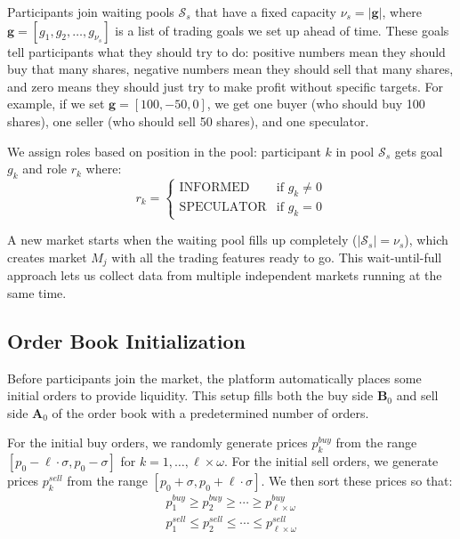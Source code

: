 Participants join waiting pools $\mathcal{S}_s$ that have a fixed capacity $\nu_s = |\mathbf{g}|$, where $\mathbf{g} = [g_1, g_2, \ldots, g_{\nu_s}]$ is a list of trading goals we set up ahead of time. These goals tell participants what they should try to do: positive numbers mean they should buy that many shares, negative numbers mean they should sell that many shares, and zero means they should just try to make profit without specific targets. For example, if we set $\mathbf{g} = [100, -50, 0]$, we get one buyer (who should buy 100 shares), one seller (who should sell 50 shares), and one speculator.

We assign roles based on position in the pool: participant $k$ in pool $\mathcal{S}_s$ gets goal $g_k$ and role $r_k$ where:
\begin{equation}
r_k = \begin{cases}
\text{INFORMED} & \text{if } g_k \neq 0 \\
\text{SPECULATOR} & \text{if } g_k = 0
\end{cases}
\end{equation}

A new market starts when the waiting pool fills up completely ($|\mathcal{S}_s| = \nu_s$), which creates market $M_j$ with all the trading features ready to go. This wait-until-full approach lets us collect data from multiple independent markets running at the same time.

\subsection{Order Book Initialization}

Before participants join the market, the platform automatically places some initial orders to provide liquidity. This setup fills both the buy side $\mathbf{B}_0$ and sell side $\mathbf{A}_0$ of the order book with a predetermined number of orders.

For the initial buy orders, we randomly generate prices $p^{buy}_k$ from the range $[p_0 - \ell \cdot \sigma, p_0 - \sigma]$ for $k = 1, \ldots, \ell \times \omega$. For the initial sell orders, we generate prices $p^{sell}_k$ from the range $[p_0 + \sigma, p_0 + \ell \cdot \sigma]$. We then sort these prices so that:
\begin{align}
p^{buy}_1 \geq p^{buy}_2 \geq \cdots \geq p^{buy}_{\ell \times \omega} \\
p^{sell}_1 \leq p^{sell}_2 \leq \cdots \leq p^{sell}_{\ell \times \omega}
\end{align}

